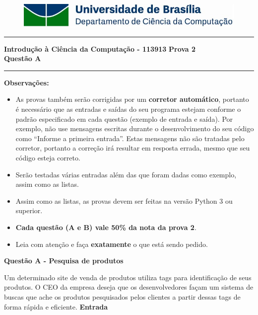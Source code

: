 \documentclass[a4paper, 12pt]{article}
\begin{document}
\begin{figure}[H]
	\includegraphics[scale=0.9]{UnB_CiC_Logo.jpg}
\end{figure}
\noindent\rule{\textwidth}{0.4pt}
\begin{center}
	\textbf{{\Large Introdução à Ciência da Computação - 113913}} \newline \newline
	\textbf{{\large Prova 2} \\
	\vspace{9pt}
	{\large Questão A}} \\
	\noindent\rule{\textwidth}{0.4pt}
	\newline
\end{center}

\textbf{{\large Observações:}}
\begin{itemize}
	\item As provas também serão corrigidas por um \textbf{corretor automático}, portanto é necessário que as entradas e saídas do seu programa estejam conforme o padrão especificado em cada questão (exemplo de entrada e saída). Por exemplo, não use mensagens escritas durante o desenvolvimento do seu código como “Informe a primeira entrada”. Estas mensagens não são tratadas pelo corretor, portanto a correção irá resultar em resposta errada, mesmo que seu código esteja correto.
	\item Serão testadas várias entradas além das que foram dadas como exemplo, assim como as listas.
	\item Assim como as listas, as provas devem ser feitas na versão Python 3 ou superior.
	\item \textbf{Cada questão (A e B) vale 50\% da nota da prova 2}.
	\item Leia com atenção e faça \textbf{exatamente} o que está sendo pedido.
\end{itemize}
\newpage %
\begin{center}
\textbf{{\Large Questão A - Pesquisa de produtos}}
\end{center}
\vspace{5pt}


Um determinado site de venda de produtos utiliza tags para identificação de seus produtos. O CEO da empresa deseja que os desenvolvedores façam um sistema de buscas que ache os produtos pesquisados pelos clientes a partir dessas tags de forma rápida e eficiente.
\newline \newline
\textbf{{\large Entrada}} \newline
\end{document}
